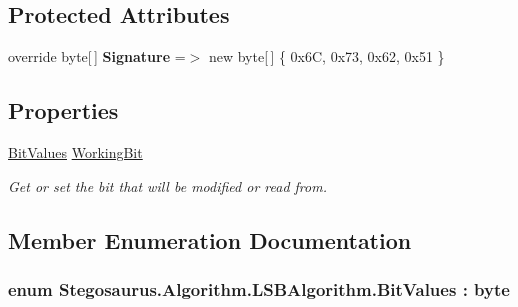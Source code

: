 \subsection*{Protected Attributes}
\begin{DoxyCompactItemize}
\item 
override byte\mbox{[}$\,$\mbox{]} {\bfseries Signature} =$>$ new byte\mbox{[}$\,$\mbox{]} \{ 0x6\+C, 0x73, 0x62, 0x51 \}\hypertarget{class_stegosaurus_1_1_algorithm_1_1_l_s_b_algorithm_aaed083366d8d7791df589878cb5a80b4}{}\label{class_stegosaurus_1_1_algorithm_1_1_l_s_b_algorithm_aaed083366d8d7791df589878cb5a80b4}

\end{DoxyCompactItemize}
\subsection*{Properties}
\begin{DoxyCompactItemize}
\item 
\hyperlink{class_stegosaurus_1_1_algorithm_1_1_l_s_b_algorithm_a8c5aef64ddbc41d8aeab953254b3c244}{Bit\+Values} \hyperlink{class_stegosaurus_1_1_algorithm_1_1_l_s_b_algorithm_aa472d9a95ff87d372406e666707cac12}{Working\+Bit}
\begin{DoxyCompactList}\small\item\em Get or set the bit that will be modified or read from. \end{DoxyCompactList}\end{DoxyCompactItemize}


\subsection{Member Enumeration Documentation}
\subsubsection[{\texorpdfstring{Bit\+Values}{BitValues}}]{\setlength{\rightskip}{0pt plus 5cm}enum {\bf Stegosaurus.\+Algorithm.\+L\+S\+B\+Algorithm.\+Bit\+Values} \+: byte\hspace{0.3cm}{\ttfamily [strong]}}\hypertarget{class_stegosaurus_1_1_algorithm_1_1_l_s_b_algorithm_a8c5aef64ddbc41d8aeab953254b3c244}{}\label{class_stegosaurus_1_1_algorithm_1_1_l_s_b_algorithm_a8c5aef64ddbc41d8aeab953254b3c244}


